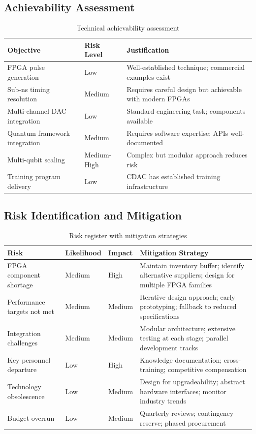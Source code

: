 \documentclass[12pt,a4paper]{article}
\theoremstyle{definition}
\begin{document}
\subsection{Achievability Assessment}

\begin{table}[htbp]
\centering
\caption{Technical achievability assessment}
\label{tab:achievability}
\begin{tabular}{@{}p{4cm}p{2cm}p{6cm}@{}}
\toprule
\textbf{Objective} & \textbf{Risk Level} & \textbf{Justification} \\
\midrule
FPGA pulse generation & Low & Well-established technique; commercial examples exist \\
Sub-ns timing resolution & Medium & Requires careful design but achievable with modern FPGAs \\
Multi-channel DAC integration & Low & Standard engineering task; components available \\
Quantum framework integration & Medium & Requires software expertise; APIs well-documented \\
Multi-qubit scaling & Medium-High & Complex but modular approach reduces risk \\
Training program delivery & Low & CDAC has established training infrastructure \\
\bottomrule
\end{tabular}
\end{table}

\subsection{Risk Identification and Mitigation}

\begin{table}[htbp]
\centering
\caption{Risk register with mitigation strategies}
\label{tab:risks}
\begin{tabular}{@{}p{3cm}p{1.5cm}p{1.5cm}p{6cm}@{}}
\toprule
\textbf{Risk} & \textbf{Likelihood} & \textbf{Impact} & \textbf{Mitigation Strategy} \\
\midrule
FPGA component shortage & Medium & High & Maintain inventory buffer; identify alternative suppliers; design for multiple FPGA families \\
\midrule
Performance targets not met & Medium & Medium & Iterative design approach; early prototyping; fallback to reduced specifications \\
\midrule
Integration challenges & Medium & Medium & Modular architecture; extensive testing at each stage; parallel development tracks \\
\midrule
Key personnel departure & Low & High & Knowledge documentation; cross-training; competitive compensation \\
\midrule
Technology obsolescence & Low & Medium & Design for upgradeability; abstract hardware interfaces; monitor industry trends \\
\midrule
Budget overrun & Low & Medium & Quarterly reviews; contingency reserve; phased procurement \\
\bottomrule
\end{tabular}
\end{table}
\end{document}
